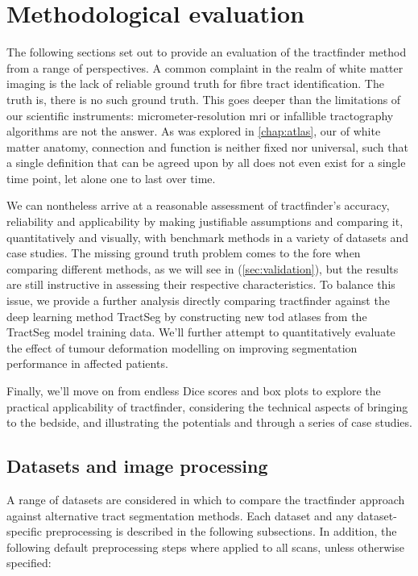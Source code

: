 \chapter{Methodological evaluation}

The following sections set out to provide an evaluation of the tractfinder method from a range of perspectives.
A common complaint in the realm of white matter imaging is the lack of reliable ground truth for fibre tract identification.
The truth is, there is no such ground truth.
This goes deeper than the limitations of our scientific instruments: micrometer-resolution \gls{mri} or infallible tractography algorithms are not the answer.
As was explored in \ref{chap:atlas}, our  of white matter anatomy, connection and function is neither fixed nor universal, such that a single definition that can be agreed upon by all does not even exist for a single time point, let alone one to last over time.

We can nontheless arrive at a reasonable assessment of tractfinder's accuracy, reliability and applicability by making justifiable assumptions and comparing it, quantitatively and visually, with benchmark methods in a variety of datasets and case studies.
The missing ground truth problem comes to the fore when comparing different methods, as we will see in (\ref{sec:validation}), but the results are still instructive in assessing their respective characteristics.
To balance this issue, we provide a further analysis directly comparing tractfinder against the deep learning method TractSeg by constructing new \gls{tod} atlases from the TractSeg model training data.
We'll further attempt to quantitatively evaluate the effect of tumour deformation modelling on improving segmentation performance in affected patients.

Finally, we'll move on from endless Dice scores and box plots to explore the practical applicability of tractfinder, considering the technical aspects of bringing to the bedside, and illustrating the potentials and  through a series of case studies.

\section{Datasets and image processing}
\label{sec:data}

A range of datasets are considered in which to compare the tractfinder approach against alternative tract segmentation methods.
Each dataset and any dataset-specific preprocessing is described in the following subsections.
In addition, the following default preprocessing steps where applied to all scans, unless otherwise specified:

